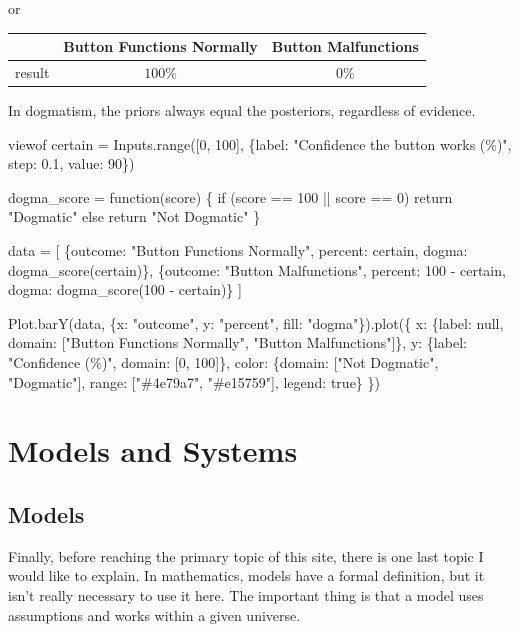 \documentclass[
  letterpaper,
  DIV=11,
  numbers=noendperiod]{scrreprt}
\newenvironment{Shaded}{\begin{snugshade}}{\end{snugshade}}
\newcommand{\NormalTok}[1]{\textcolor[rgb]{0.00,0.23,0.31}{#1}}
\newcounter{none} %
\theoremstyle{remark}
\begin{document}
or

{\def\LTcaptype{none} %
\begin{longtable}[]{@{}lcc@{}}
\toprule\noalign{}
& Button Functions Normally & Button Malfunctions \\
\midrule\noalign{}
\endhead
\bottomrule\noalign{}
\endlastfoot
result & \(100\%\) & \(0\%\) \\
\end{longtable}
}

In dogmatism, the priors always equal the posteriors, regardless of
evidence.

\begin{Shaded}
\begin{Highlighting}[]
\NormalTok{viewof certain = Inputs.range([0, 100], \{label: "Confidence the button works (\%)", step: 0.1, value: 90\})}

\NormalTok{dogma\_score = function(score)}
\NormalTok{\{}
\NormalTok{  if (score == 100 || score == 0)}
\NormalTok{    return "Dogmatic"}
\NormalTok{  else}
\NormalTok{    return "Not Dogmatic"}
\NormalTok{\}}

\NormalTok{data = [}
\NormalTok{  \{outcome: "Button Functions Normally", percent: certain,       dogma: dogma\_score(certain)\},}
\NormalTok{  \{outcome: "Button Malfunctions",       percent: 100 {-} certain, dogma: dogma\_score(100 {-} certain)\}}
\NormalTok{]}

\NormalTok{Plot.barY(data, \{x: "outcome", y: "percent", fill: "dogma"\}).plot(\{}
\NormalTok{  x: \{label: null, domain: ["Button Functions Normally", "Button Malfunctions"]\},}
\NormalTok{  y: \{label: "Confidence (\%)", domain: [0, 100]\},}
\NormalTok{  color: \{domain: ["Not Dogmatic", "Dogmatic"], range: ["\#4e79a7", "\#e15759"], legend: true\}}
\NormalTok{\})}
\end{Highlighting}
\end{Shaded}


\chapter{Models and Systems}\label{models-and-systems}

\section{Models}\label{models}

Finally, before reaching the primary topic of this site, there is one
last topic I would like to explain. In mathematics, models have a formal
definition, but it isn't really necessary to use it here. The important
thing is that a model uses assumptions and works within a given
universe.
\end{document}
